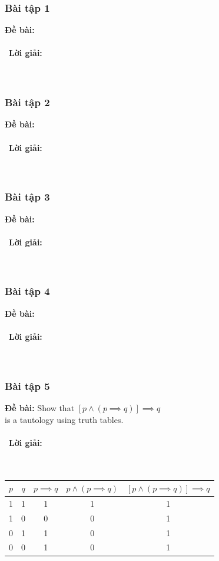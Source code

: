 \documentclass[a4paper]{article}
\begin{document}
\subsubsection{Bài tập 1}
\textbf{Đề bài:} 
\\\ \\\
\textbf{Lời giải:} \\\ \\\
\clearpage
\subsubsection{Bài tập 2}
\textbf{Đề bài:} 
\\\ \\\
\textbf{Lời giải:} \\\ \\\
\clearpage
\subsubsection{Bài tập 3}
\textbf{Đề bài:} 
\\\ \\\
\textbf{Lời giải:} \\\ \\\
\clearpage
\subsubsection{Bài tập 4}
\textbf{Đề bài:} 
\\\ \\\
\textbf{Lời giải:} \\\ \\\
\clearpage
\subsubsection{Bài tập 5}
\textbf{Đề bài:} Show that $[p \land (p \implies q)] \implies q$\\ is a tautology using truth tables.
\\\ \\\
\textbf{Lời giải:}\\\ \\\
\begin{table} [h]
		\centering
		\begin{tabular} {|c|c|c|c|c|}
			\hline
			$p$&$q$&$p \implies q$& $p \land (p \implies q)$ &$[p \land (p \implies q)]\implies q$\\
			\hline
			1&1&1&1&1\\
			\hline
			1&0&0&0&1\\
			\hline
			0&1&1&0&1\\
			\hline
			0&0&1&0&1\\
			\hline
		\end{tabular}
	\end{table}
\clearpage
\end{document}
